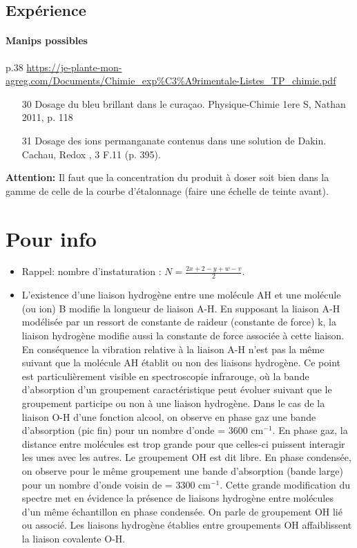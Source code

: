 \documentclass[11pt]{report}
\numberwithin{figure}{section}
\numberwithin{equation}{section}
\numberwithin{table}{section}
\newcommand{\1}{\boldsymbol{1}}
\begin{document}
\subsection{Expérience}

\paragraph{Manips possibles} p.38 \url{https://je-plante-mon-agreg.com/Documents/Chimie_exp%C3%A9rimentale-Listes_TP_chimie.pdf}
\begin{itemize}
\item [30] Dosage du bleu brillant dans le curaçao. Physique-Chimie 1ere S, Nathan 2011, p. 118
\item [31] Dosage des ions permanganate contenus dans une solution de Dakin. Cachau, Redox , 3 F.11 (p. 395). 
\end{itemize}

\textbf{Attention:} Il faut que la concentration du produit à doser soit bien dans la gamme de celle de la courbe d'étalonnage (faire une échelle de teinte avant).


\section*{Pour info}

\begin{itemize}
\item Rappel: nombre d'instaturation : $N = \frac{2x+2 -y + w - v}{2}$.
\item L'existence d'une liaison hydrogène entre une molécule AH et une molécule (ou ion) B modifie la longueur de liaison A-H. En supposant la liaison A-H modélisée par un ressort de constante de raideur (constante de force) k, la liaison hydrogène modifie aussi la constante de force associée à cette liaison. En conséquence la vibration relative à la liaison A-H n'est pas la même suivant que la molécule AH établit ou non des liaisons hydrogène. Ce point est particulièrement visible en spectroscopie infrarouge, où la bande d'absorption d'un groupement caractéristique peut évoluer suivant que le groupement participe ou non à une liaison hydrogène. Dans le cas de la liaison O-H d'une fonction alcool, on observe en phase gaz une bande d'absorption (pic fin) pour un nombre d'onde = 3600 cm$^{-1}$. En phase gaz, la distance entre molécules est trop grande pour que celles-ci puissent interagir les unes avec les autres. Le groupement OH est dit libre. En phase condensée, on observe pour le même groupement une bande d'absorption (bande large) pour un nombre d'onde voisin de = 3300 cm$^{-1}$. Cette grande modification du spectre met en évidence la présence de liaisons hydrogène entre molécules d'un même échantillon en phase condensée. On parle de groupement OH lié ou associé. Les liaisons hydrogène établies entre groupements OH affaiblissent la liaison covalente O-H. 
\end{itemize}
\end{document}
